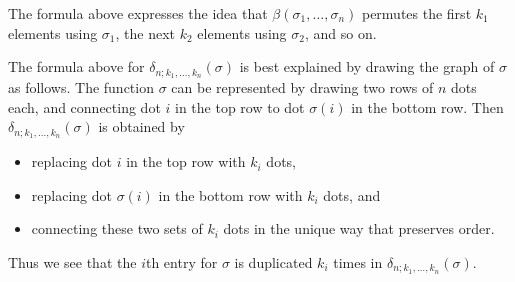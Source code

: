 \begin{rem}\label{rem:beta-s}
The formula above expresses the idea that $\beta( \sigma_1, \ldots, \sigma_n )$ permutes the first $k_1$ elements using $\sigma_1$, the next $k_2$ elements using $\sigma_2$, and so on.
\end{rem}


\begin{rem}\label{rem:delta-s}
The formula above for $\delta_{n; k_1, \ldots, k_n}(\sigma)$ is best explained by drawing the graph of $\sigma$ as follows. The function $\sigma$ can be represented by drawing two rows of $n$ dots each, and connecting dot $i$ in the top row to dot $\sigma(i)$ in the bottom row. Then $\delta_{n; k_1, \ldots, k_n}(\sigma)$ is obtained by 
\begin{itemize}
\item replacing dot $i$ in the top row with $k_i$ dots,
\item replacing dot $\sigma(i)$ in the bottom row with $k_i$ dots, and
\item connecting these two sets of $k_i$ dots in the unique way that preserves order.
\end{itemize}
Thus we see that the $i$th entry for $\sigma$ is duplicated $k_i$ times in $\delta_{n; k_1, \ldots, k_n}(\sigma)$.
\end{rem}

